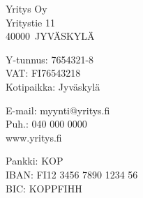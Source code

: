 \documentclass[a4paper]{article}
\makeatletter
\newcommand{\thebusinessid}{Y-tunnus}
\newcommand{\thevat}{VAT}
\newcommand{\thedomicile}{Kotipaikka}
\newcommand{\theemail}{E-mail}
\newcommand{\thephone}{Puh.}
\newcommand{\thebank}{Pankki}
\newcommand{\thebusinessid}{Business ID}
\newcommand{\thevat}{VAT}
\newcommand{\thedomicile}{Domicile}
\newcommand{\theemail}{E-mail}
\newcommand{\thephone}{Tel.}
\newcommand{\thebank}{Bank}
\newcommand{\companyname}{Yritys Oy}
\newcommand{\companyaddress}{Yritystie 11}
\newcommand{\companyzip}{40000}
\newcommand{\companycity}{Jyväskylä}
\newcommand{\companyid}{7654321-8}
\newcommand{\companyvat}{FI76543218}
\newcommand{\companydomicile}{Jyväskylä}
\newcommand{\companywww}{www.yritys.fi}
\newcommand{\companyemail}{myynti@yritys.fi}
\newcommand{\companyphone}{040 000 0000}
\newcommand{\companybank}{KOP}
\newcommand{\companyiban}{FI12 3456 7890 1234 56}
\newcommand{\companybic}{KOPPFIHH}
\makeatother
\begin{document}
\begin{center}
\begin{minipage}[t][175mm][t]{168mm}
\vfill


\begin{center}
\fontsize{7pt}{8pt}\selectfont
\parbox[t][10mm][t]{39mm}{\raggedright \companyname\\ \companyaddress\\ \companyzip\ \MakeUppercase{\companycity}}
\parbox[t][10mm][t]{44mm}{\raggedright \thebusinessid: \companyid\\ \thevat: \companyvat\\ \thedomicile: \companydomicile}
\parbox[t][10mm][t]{47mm}{\raggedright \theemail: \companyemail\\ \thephone: \companyphone\\ \companywww}
\parbox[t][10mm][t]{33mm}{\raggedright \thebank: \companybank\\ IBAN: \companyiban\\ BIC: \companybic}
\end{center}

\end{minipage}\end{center}
\end{document}
